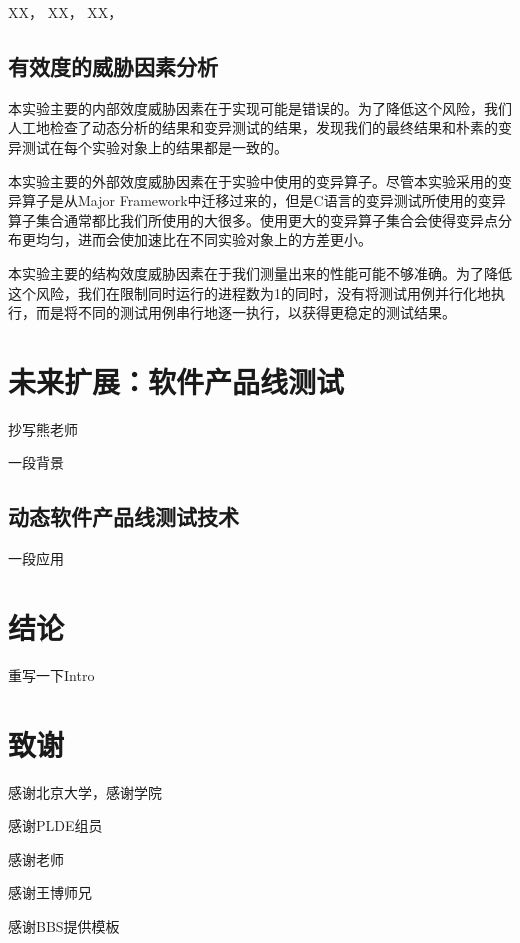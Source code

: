 \documentclass[nofonts]{ctexrep}
\begin{document}
XX，
XX，
XX，

\section{有效度的威胁因素分析}
本实验主要的内部效度威胁因素在于实现可能是错误的。为了降低这个风险，我们人工地检查了动态分析的结果和变异测试的结果，发现我们的最终结果和朴素的变异测试在每个实验对象上的结果都是一致的。

本实验主要的外部效度威胁因素在于实验中使用的变异算子。尽管本实验采用的变异算子是从Major Framework中迁移过来的，但是C语言的变异测试所使用的变异算子集合通常都比我们所使用的大很多。使用更大的变异算子集合会使得变异点分布更均匀，进而会使加速比在不同实验对象上的方差更小。

本实验主要的结构效度威胁因素在于我们测量出来的性能可能不够准确。为了降低这个风险，我们在限制同时运行的进程数为1的同时，没有将测试用例并行化地执行，而是将不同的测试用例串行地逐一执行，以获得更稳定的测试结果。



\chapter{未来扩展：软件产品线测试}
抄写熊老师

一段背景

\section{动态软件产品线测试技术}
一段应用

\chapter{结论}
重写一下Intro




\chapter*{致谢}
感谢北京大学，感谢学院

感谢PLDE组员

感谢老师

感谢王博师兄

感谢BBS提供模板
\end{document}
